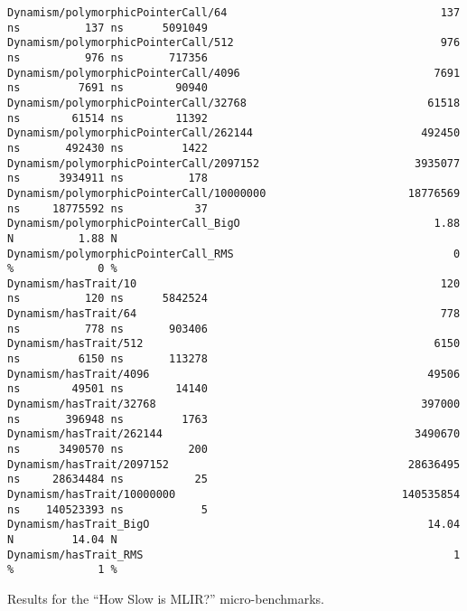 \begin{code}
\begin{verbatim}
Dynamism/polymorphicPointerCall/64                                 137 ns          137 ns      5091049
Dynamism/polymorphicPointerCall/512                                976 ns          976 ns       717356
Dynamism/polymorphicPointerCall/4096                              7691 ns         7691 ns        90940
Dynamism/polymorphicPointerCall/32768                            61518 ns        61514 ns        11392
Dynamism/polymorphicPointerCall/262144                          492450 ns       492430 ns         1422
Dynamism/polymorphicPointerCall/2097152                        3935077 ns      3934911 ns          178
Dynamism/polymorphicPointerCall/10000000                      18776569 ns     18775592 ns           37
Dynamism/polymorphicPointerCall_BigO                              1.88 N          1.88 N
Dynamism/polymorphicPointerCall_RMS                                  0 %             0 %
Dynamism/hasTrait/10                                               120 ns          120 ns      5842524
Dynamism/hasTrait/64                                               778 ns          778 ns       903406
Dynamism/hasTrait/512                                             6150 ns         6150 ns       113278
Dynamism/hasTrait/4096                                           49506 ns        49501 ns        14140
Dynamism/hasTrait/32768                                         397000 ns       396948 ns         1763
Dynamism/hasTrait/262144                                       3490670 ns      3490570 ns          200
Dynamism/hasTrait/2097152                                     28636495 ns     28634484 ns           25
Dynamism/hasTrait/10000000                                   140535854 ns    140523393 ns            5
Dynamism/hasTrait_BigO                                           14.04 N         14.04 N
Dynamism/hasTrait_RMS                                                1 %             1 %
    \end{verbatim}
    \caption{Results for the ``How Slow is MLIR?'' micro-benchmarks.}
    \label{listing:how-slow-is-mlir-microbenchmark-results}
\end{code}
